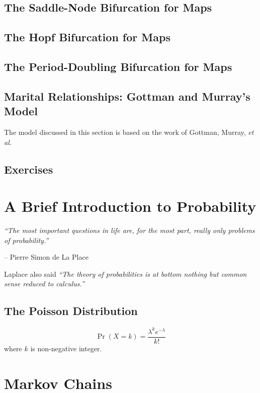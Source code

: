 \documentclass[reqno]{immbook}
\numberwithin{equation}{chapter}
\numberwithin{question}{section}
\numberwithin{theorem}{chapter}
\numberwithin{figure}{chapter}
\theoremstyle{definition}
\begin{document}
\newpage

\section{The Saddle-Node Bifurcation for Maps}

\section{The Hopf Bifurcation for Maps}

\section{The Period-Doubling Bifurcation for Maps}

\section{Marital Relationships: Gottman and Murray's Model}
The model discussed in this section is based on the
work of Gottman, Murray, \emph{et al}\cite{GM}.
\section{Exercises}
%
%
%
%
\chapter{A Brief Introduction to Probability}

\emph{``The most important questions in life are, for the 
       most part, really only problems of probability.''}


\hfill            -- Pierre Simon de La Place

\bigskip
Laplace also said \emph{``The theory of probabilities is at bottom nothing but common sense 
      reduced to calculus.''}


\section{The Poisson Distribution}
\begin{equation}
  \Pr(X=k) = \frac{\lambda^k e^{-\lambda}}{k!}
\end{equation}
where $k$ is non-negative integer.



\chapter{Markov Chains}
\end{document}
